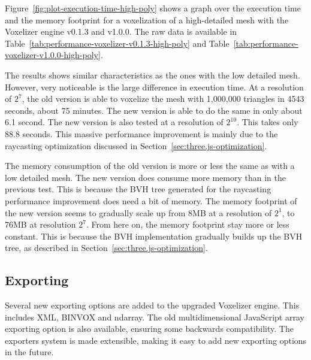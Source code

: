 Figure~\ref{fig:plot-execution-time-high-poly} shows a graph over the execution time and the memory footprint for a voxelization of a high-detailed mesh with the Voxelizer engine v0.1.3 and v1.0.0. The raw data is available in Table~\ref{tab:performance-voxelizer-v0.1.3-high-poly} and Table~\ref{tab:performance-voxelizer-v1.0.0-high-poly}.

The results shows similar characteristics as the ones with the low detailed mesh. However, very noticeable is the large difference in execution time. At a resolution of $2^{7}$, the old version is able to voxelize the mesh with 1,000,000 triangles in 4543 seconds, about 75 minutes. The new version is able to do the same in only about 6.1 second. The new version is also tested at a resolution of $2^{10}$. This takes only 88.8 seconds. This massive performance improvement is mainly due to the raycasting optimization discussed in Section~\ref{sec:three.js-optimization}.

The memory consumption of the old version is more or less the same as with a low detailed mesh. The new version does consume more memory than in the previous test. This is because the BVH tree generated for the raycasting performance improvement does need a bit of memory. The memory footprint of the new version seems to gradually scale up from 8MB at a resolution of $2^1$, to 76MB at resolution $2^7$. From here on, the memory footprint stay more or less constant. This is because the BVH implementation gradually builds up the BVH tree, as described in Section~\ref{sec:three.js-optimization}.

\subsection{Exporting}
Several new exporting options are added to the upgraded Voxelizer engine. This includes XML, BINVOX and ndarray. The old multidimensional JavaScript array exporting option is also available, ensuring some backwards compatibility. The exporters system is made extensible, making it easy to add new exporting options in the future.

